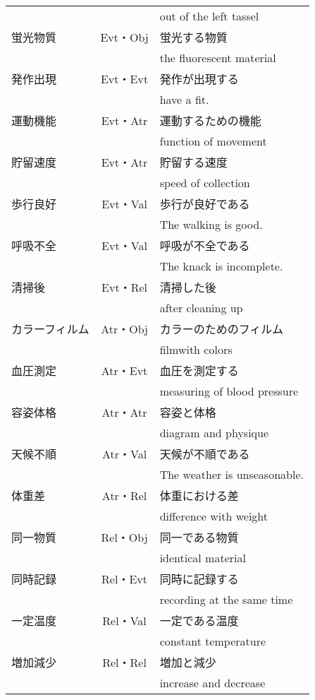\begin{table}
\begin{center}
\begin{tabular}{l|c|l}
                &           & out of the left tassel\\
 蛍光物質       & Evt・Obj  & 蛍光する物質\\
                &           & the fluorescent material\\
 発作出現       & Evt・Evt  & 発作が出現する\\
                &           & have a fit.\\
 運動機能       & Evt・Atr  & 運動するための機能\\
                &           & function of movement\\
貯留速度 & Evt・Atr & 貯留する速度\\
         &          & speed of collection\\
 歩行良好       & Evt・Val  & 歩行が良好である\\
                &           & The walking is good.\\
呼吸不全 & Evt・Val & 呼吸が不全である\\
         &          & The knack is incomplete.\\
 清掃後         & Evt・Rel  & 清掃した後\\
                &           & after cleaning up\\
 カラーフィルム & Atr・Obj  & カラーのためのフィルム\\
                &           & filmwith colors\\
 血圧測定       & Atr・Evt  & 血圧を測定する\\
                &           & measuring of blood pressure\\
 容姿体格       & Atr・Atr  & 容姿と体格\\
                &           & diagram and physique\\
 天候不順       & Atr・Val  & 天候が不順である\\
                &           & The weather is unseasonable.\\
 体重差         & Atr・Rel  & 体重における差\\
                &           & difference with weight\\
 同一物質       & Rel・Obj  & 同一である物質\\
                &           & identical material\\
 同時記録       & Rel・Evt  & 同時に記録する\\
                &           & recording at the same time\\
 一定温度       & Rel・Val  & 一定である温度\\
                &           & constant temperature\\
 増加減少       & Rel・Rel  & 増加と減少\\
                &           & increase and decrease\\
\hline
\end{tabular}
\end{center}
\end{table}

